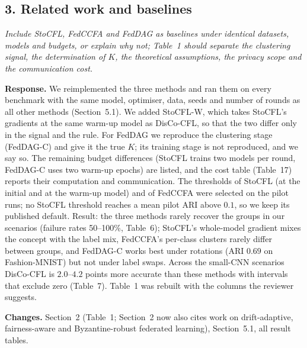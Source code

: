 \documentclass[11pt]{article}
\newenvironment{revcomment}{\par\medskip\noindent\begin{minipage}{\linewidth}\color{blue!45!black}\itshape}{\end{minipage}\par\smallskip}
\newcommand{\resp}{\par\noindent\textbf{Response.} }
\newcommand{\chg}{\par\noindent\textbf{Changes.} }
\begin{document}
\subsection*{3. Related work and baselines}
\begin{revcomment}
Include StoCFL, FedCCFA and FedDAG as baselines under identical datasets, models and budgets, or explain why not; Table~1 should separate the clustering signal, the determination of $K$, the theoretical assumptions, the privacy scope and the communication cost.
\end{revcomment}
\resp We reimplemented the three methods and ran them on every benchmark with the same model, optimiser, data, seeds and number of rounds as all other methods (Section~5.1). We added StoCFL-W, which takes StoCFL's gradients at the same warm-up model as DisCo-CFL, so that the two differ only in the signal and the rule. For FedDAG we reproduce the clustering stage (FedDAG-C) and give it the true $K$; its training stage is not reproduced, and we say so. The remaining budget differences (StoCFL trains two models per round, FedDAG-C uses two warm-up epochs) are listed, and the cost table (Table~17) reports their computation and communication. The thresholds of StoCFL (at the initial and at the warm-up model) and of FedCCFA were selected on the pilot runs; no StoCFL threshold reaches a mean pilot ARI above $0.1$, so we keep its published default. Result: the three methods rarely recover the groups in our scenarios (failure rates 50--100\%, Table~6); StoCFL's whole-model gradient mixes the concept with the label mix, FedCCFA's per-class clusters rarely differ between groups, and FedDAG-C works best under rotations (ARI $0.69$ on Fashion-MNIST) but not under label swaps. Across the small-CNN scenarios DisCo-CFL is $2.0$--$4.2$ points more accurate than these methods with intervals that exclude zero (Table~7). Table~1 was rebuilt with the columns the reviewer suggests.
\chg Section~2 (Table~1; Section~2 now also cites work on drift-adaptive, fairness-aware and Byzantine-robust federated learning), Section~5.1, all result tables.
\end{document}
